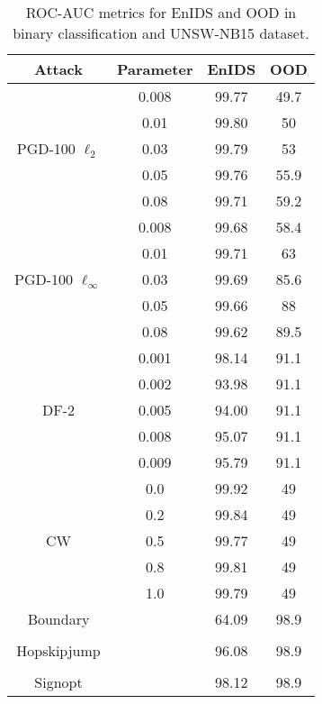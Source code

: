 \documentclass[conference]{IEEEtran}
\begin{document}
	\begin{table}[H]
		\caption{ROC-AUC metrics for EnIDS and OOD in binary classification and UNSW-NB15 dataset.}
		\small
		\setlength{\tabcolsep}{1pt}
		\centering
		\label{tab:unsw_multi_ood}
		
		\begin{tabular}{|c|c|c|c|}
			\hline
			\textbf{Attack} & \textbf{Parameter} & \textbf{EnIDS} & \textbf{OOD}
			\\
			\hline
			\multirow{5}{*}{PGD-100 $\ell_2$}& 0.008 & 99.77 & 49.7
			\\
			
			& 0.01 & 99.80 & 50
			\\
			
			& 0.03 & 99.79 & 53
			\\
			
			& 0.05 & 99.76 & 55.9
			\\
			
			& 0.08 & 99.71 & 59.2
			\\
			\hline
			\multirow{5}{*}{PGD-100 $\ell_\infty$}& 0.008 & 99.68 & 58.4
			\\
			
			& 0.01 & 99.71 & 63
			\\
			
			& 0.03 & 99.69 & 85.6
			\\
			
			& 0.05 & 99.66 & 88
			\\
			
			& 0.08 & 99.62 & 89.5
			\\
			\hline
			\multirow{5}{*}{DF-2}& 0.001 & 98.14 & 91.1
			\\
			
			& 0.002 & 93.98 & 91.1
			\\
			
			& 0.005 & 94.00 & 91.1
			\\
			
			& 0.008 & 95.07 & 91.1
			\\
			
			& 0.009 & 95.79 & 91.1
			\\
			\hline
			\multirow{5}{*}{CW}& 0.0 & 99.92 & 49
			\\
			
			& 0.2 & 99.84 & 49
			\\
			
			& 0.5 & 99.77 & 49
			\\
			
			& 0.8 & 99.81 & 49
			\\
			
			& 1.0 & 99.79 & 49
			\\
			\hline
			Boundary &  & 64.09 & 98.9
			\\
			\hline
			&  &  & 
			\\
			\hline
			Hopskipjump &  & 96.08 & 98.9
			\\
			\hline
			&  &  & 
			\\
			\hline
			Signopt &  & 98.12 & 98.9
			\\
			\hline
		\end{tabular}
		
	\end{table}	
	
\end{document}
